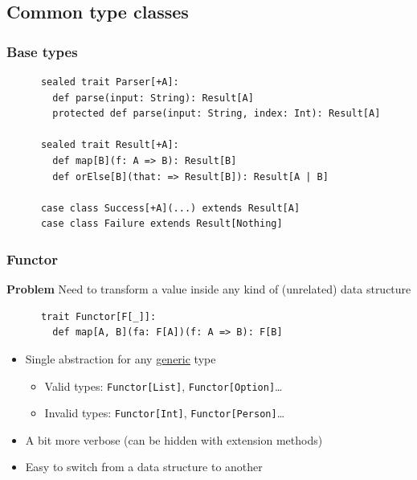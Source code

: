 \subsection{Common type classes}

\begin{frame}[fragile]
  \frametitle{Base types}

  \begin{definition}
    \begin{lstlisting}
      sealed trait Parser[+A]:
        def parse(input: String): Result[A]
        protected def parse(input: String, index: Int): Result[A]
  
      sealed trait Result[+A]:
        def map[B](f: A => B): Result[B]
        def orElse[B](that: => Result[B]): Result[A | B]

      case class Success[+A](...) extends Result[A]
      case class Failure extends Result[Nothing]
    \end{lstlisting}
  \end{definition}
\end{frame}

\begin{frame}[fragile]
  \frametitle{Functor}

  \textbf{Problem} Need to transform a value inside any kind of (unrelated) data structure

  \begin{definition}[Functor]
    \begin{lstlisting}
      trait Functor[F[_]]:
        def map[A, B](fa: F[A])(f: A => B): F[B]
    \end{lstlisting}
  \end{definition}

  \begin{itemize}
    \item Single abstraction for any \ul{generic} type
          \begin{itemize}
            \item Valid types: \texttt{Functor[List]}, \texttt{Functor[Option]}\dots
            \item Invalid types: \texttt{Functor[Int]}, \texttt{Functor[Person]}\dots
          \end{itemize}
    \item A bit more verbose (can be hidden with extension methods)
    \item Easy to switch from a data structure to another
  \end{itemize}
\end{frame}

